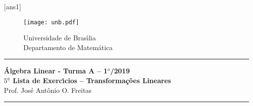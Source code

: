 \documentclass[12pt]{exam}
\newtheorem{exercicio}{}
\newcommand{\cp}[1]{\mathbb{#1}}
\newcommand{\vesp}[1]{\vspace{ #1  cm}}
\begin{document}

[ans1]

\begin{figure}[h]
        \begin{minipage}[c]{1.7cm}
        \texttt{[image: unb.pdf]}
        \end{minipage}%
        \hspace{0pt}
        \begin{minipage}[c]{4in}
          {Universidade de Bras{\'\i}lia} \\
          {Departamento de Matem{\'a}tica}
\end{minipage}
\end{figure}

\vesp{-0.35} \hrule

\begin{center}
{\Large\bf \'Algebra Linear - Turma A -- 1$^{o}$/2019} \\ \vspace{9pt} {\large\bf
  $5^{\underline{a}}$ Lista de Exerc{\'\i}cios -- Transforma\c{c}\~oes Lineares}\\ \vspace{9pt} Prof. Jos{\'e} Ant{\^o}nio O. Freitas
\end{center}
\hrule

\vesp{.6}


\end{document}
